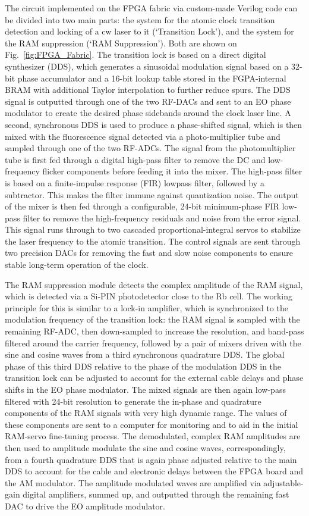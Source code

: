 \documentclass[aip,graphicx]{revtex4-2}
\begin{document}
	The circuit implemented on the FPGA fabric via custom-made Verilog code can be divided into two main parts: the system for the atomic clock transition detection and locking of a cw laser to it (‘Transition Lock’), and the system for the RAM suppression (‘RAM Suppression’). Both are shown on Fig.~\ref{fig:FPGA_Fabric}. The transition lock is based on a direct digital synthesizer (DDS), which generates a sinusoidal modulation signal based on a 32-bit phase accumulator and a 16-bit lookup table stored in the FGPA-internal BRAM with additional Taylor interpolation to further reduce spurs. The DDS signal is outputted through one of the two RF-DACs and sent to an EO phase modulator to create the desired phase sidebands around the clock laser line. A second, synchronous DDS is used to produce a phase-shifted signal, which is then mixed with the fluorescence signal detected via a photo-multiplier tube and sampled through one of the two RF-ADCs. The signal from the photomultiplier tube is first fed through a digital high-pass filter to remove the DC and low-frequency flicker components before feeding it into the mixer. The high-pass filter is based on a finite-impulse response (FIR) lowpass filter, followed by a subtractor. This makes the filter immune against quantization noise. The output of the mixer is then fed through a configurable, 24-bit minimum-phase FIR low-pass filter to remove the high-frequency residuals and noise from the error signal. This signal runs through to two cascaded proportional-integral servos to stabilize the laser frequency to the atomic transition. The control signals are sent through two precision DACs for removing the fast and slow noise components to ensure stable long-term operation of the clock.
	
	The RAM suppression module detects the complex amplitude of the RAM signal, which is detected via a Si-PIN photodetector close to the Rb cell. The working principle for this is similar to a lock-in amplifier, which is synchronized to the modulation frequency of the transition lock: the RAM signal is sampled with the remaining RF-ADC, then down-sampled to increase the resolution, and band-pass filtered around the carrier frequency, followed by a pair of mixers driven with the sine and cosine waves from a third synchronous quadrature DDS. The global phase of this third DDS relative to the phase of the modulation DDS in the transition lock can be adjusted to account for the external cable delays and phase shifts in the EO phase modulator. The mixed signals are then again low-pass filtered with 24-bit resolution to generate the in-phase and quadrature components of the RAM signals with very high dynamic range. The values of these components are sent to a computer for monitoring and to aid in the initial RAM-servo fine-tuning process. The demodulated, complex RAM amplitudes are then used to amplitude modulate the sine and cosine waves, correspondingly, from a fourth quadrature DDS that is again phase adjusted relative to the main DDS to account for the cable and electronic delays between the FPGA board and the AM modulator. The amplitude modulated waves are amplified via adjustable-gain digital amplifiers, summed up, and outputted through the remaining fast DAC to drive the EO amplitude modulator.
	
\end{document}
